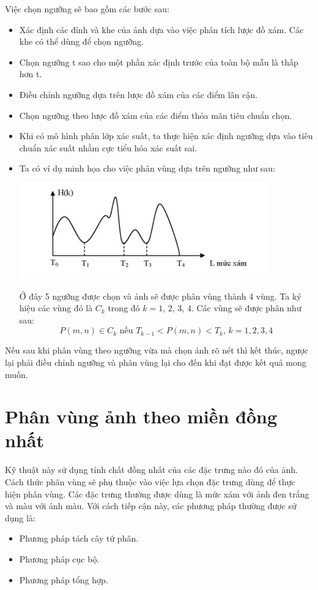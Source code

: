 \documentclass[12pt, oneside, a4paper]{book}
\begin{document}
Việc chọn ngưỡng sẽ bao gồm các bước sau:
\begin{itemize}
\item Xác định các đỉnh và khe của ảnh dựa vào việc phân tích lược đồ xám. Các khe có thể dùng để chọn ngưỡng.
\item Chọn ngưỡng t sao cho một phần xác định trước của toàn bộ mẫu là thấp hơn t.
\item Điều chỉnh ngưỡng dựa trên lược đồ xám của các điểm lân cận.
\item Chọn ngưỡng theo lược đồ xám của các điểm thỏa mãn tiêu chuẩn chọn.
\item Khi có mô hình phân lớp xác suất, ta thực hiện xác định ngưỡng dựa vào tiêu chuẩn xác suất nhằm cực tiểu hóa xác suất sai.
\item Ta có ví dụ minh họa cho việc phân vùng dựa trên ngưỡng như sau:
\begin{center}
\includegraphics[]{figure/nguongbiendo.png}
\end{center}
Ở đây 5 ngưỡng được chọn và ảnh sẽ được phân vùng thành 4 vùng. Ta ký hiệu các vùng đó là $C_k$ trong đó $k=1$, $2$, $3$, $4$. Các vùng sẽ được phân như sau:
\begin{equation}
P(m,n) \in C_{k}\textrm{ nếu } T_{k-1}<P(m,n)<T_{k}, \, k=1,2,3,4
\end{equation} 
\end{itemize}
Nếu sau khi phân vùng theo ngưỡng vừa mà chọn ảnh rõ nét thì kết thúc, ngược lại phải điều chỉnh ngưỡng và phân vùng lại cho đến khi đạt được kết quả mong muốn.
\section{Phân vùng ảnh theo miền đồng nhất}
Kỹ thuật này sử dụng tính chất đồng nhất của các đặc trưng nào đó của ảnh. Cách thức phân vùng sẽ phụ thuộc vào việc lựa chọn đặc trưng dùng để thực hiện phân vùng. Các đặc trưng thường được dùng là mức xám với ảnh đen trắng và màu với ảnh màu. Với cách tiếp cận này, các phương pháp thường được sử dụng là:
\begin{itemize}
\item  Phương pháp tách cây tứ phân.
\item Phương pháp cục bộ.
\item Phương pháp tổng hợp.
\end{itemize}
\end{document}
